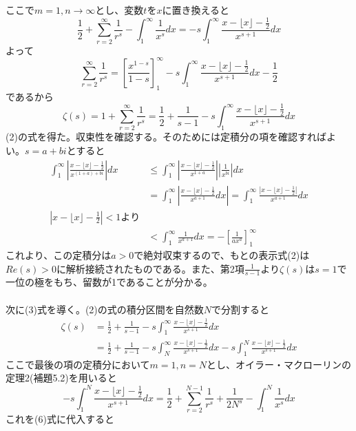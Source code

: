 \documentclass{jsarticle}
\begin{document}
ここで\(m=1,n\to\infty\)とし、変数\(t\)を\(x\)に置き換えると
\[\frac{1}{2}+\sum_{r=2}^{\infty}\frac{1}{r^{s}}-\int_{1}^{\infty}\frac{1}{x^{s}}dx=-s\int_{1}^{\infty}\frac{x-\lfloor x\rfloor-\frac{1}{2}}{x^{s+1}}dx\]
よって
\[\sum_{r=2}^{\infty}\frac{1}{r^{s}}=\left[\frac{x^{1-s}}{1-s}\right]_{1}^{\infty}-s\int_{1}^{\infty}\frac{x-\lfloor x\rfloor-\frac{1}{2}}{x^{s+1}}dx-\frac{1}{2}\]
であるから
\[\zeta(s)=1+\sum_{r=2}^{\infty}\frac{1}{r^s}=\frac{1}{2}+\frac{1}{s-1}-s\int_{1}^{\infty}\frac{x-\lfloor x\rfloor-\frac{1}{2}}{x^{s+1}}dx\]
(2)の式を得た。収束性を確認する。そのためには定積分の項を確認すればよい。\(s=a+bi\)とすると
\begin{align*}
\int_{1}^{\infty}\left|\frac{x-\lfloor x\rfloor-\frac{1}{2}}{x^{(1+a)+bi}}\right|dx&\leq\int_{1}^{\infty}\left|\frac{x-\lfloor x\rfloor-\frac{1}{2}}{x^{1+a}}\right|\left|\frac{1}{x^{bi}}\right|dx\\
&=\int_{1}^{\infty}\left|\frac{x-\lfloor x\rfloor-\frac{1}{2}}{x^{a+1}}dx\right|=\int_{1}^{\infty}\frac{\left|x-\lfloor x\rfloor-\frac{1}{2}\right|}{x^{a+1}}dx\\
\left|x-\lfloor x\rfloor-\frac{1}{2}\right|<1より\\
&<\int_{1}^{\infty}\frac{1}{x^{a+1}}dx=-\left[\frac{1}{ax^{a}}\right]_{1}^{\infty}
\end{align*}
これより、この定積分は\(a>0\)で絶対収束するので、もとの表示式(2)は\(Re(s)>0\)に解析接続されたものである。また、第2項\(\frac{1}{s-1}\)より\(\zeta(s)\)は\(s=1\)で一位の極をもち、留数が1であることが分かる。\\
\\
次に(3)式を導く。(2)の式の積分区間を自然数\(N\)で分割すると
\begin{align}
\nonumber
\zeta(s)&=\frac{1}{2}+\frac{1}{s-1}-s\int_{1}^{\infty}\frac{x-\lfloor x\rfloor-\frac{1}{2}}{x^{s+1}}dx\\ 
&=\frac{1}{2}+\frac{1}{s-1}-s\int_{N}^{\infty}\frac{x-\lfloor x\rfloor-\frac{1}{2}}{x^{s+1}}dx-s\int_{1}^{N}\frac{x-\lfloor x\rfloor-\frac{1}{2}}{x^{s+1}}dx
\end{align}
ここで最後の項の定積分において\(m=1,n=N\)とし、オイラー・マクローリンの定理2(補題5.2)を用いると
\[-s\int_{1}^{N}\frac{x-\lfloor x\rfloor-\frac{1}{2}}{x^{s+1}}dx=\frac{1}{2}+\sum_{r=2}^{N-1}\frac{1}{r^s}+\frac{1}{2N^{s}}-\int_{1}^{N}\frac{1}{x^{s}}dx\]
これを(6)式に代入すると
\end{document}
